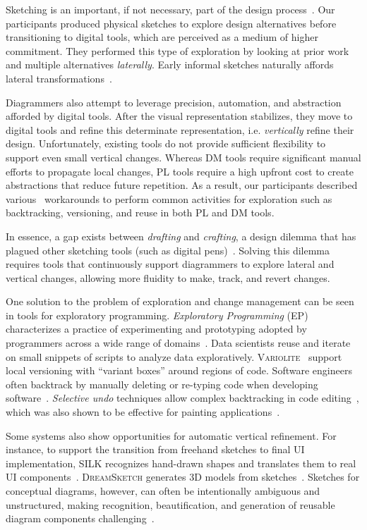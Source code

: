 Sketching is an important, if not necessary, part of the design process~\cite{BuxtonBook}. Our participants produced physical sketches to explore design alternatives before transitioning to digital tools, which are perceived as a medium of higher commitment. They performed this type of exploration by looking at prior work and multiple alternatives \emph{laterally}. Early informal sketches naturally affords lateral transformations~\cite{sketchesOfThought}. 

Diagrammers also attempt to leverage precision, automation, and abstraction afforded by digital tools. After the visual representation stabilizes, they move to digital tools and refine this determinate representation, i.e. \emph{vertically} refine their design. Unfortunately, existing tools do not provide sufficient flexibility to support even small vertical changes. Whereas DM tools require significant manual efforts to propagate local changes, PL tools require a high upfront cost to create abstractions that reduce future repetition. As a result, our participants described various ~workarounds to perform common activities for exploration such as backtracking, versioning, and reuse in both PL and DM tools. 

In essence, a gap exists between \emph{drafting} and \emph{crafting}, a design dilemma that has plagued other sketching tools (such as digital pens)~\cite{AsWeMayInk}. Solving this dilemma requires tools that continuously support diagrammers to explore lateral and vertical changes, allowing more fluidity to make, track, and revert changes.


One solution to the problem of exploration and change management can be seen in tools for exploratory programming. \emph{Exploratory Programming} (EP) characterizes a practice of experimenting and prototyping adopted by programmers across a wide range of domains~\cite{EP-Original,exploringEP}. Data scientists reuse and iterate on small snippets of scripts to analyze data exploratively. \textsc{Variolite}~\cite{Variolite} support local versioning with ``variant boxes'' around regions of code. Software engineers often backtrack by manually deleting or re-typing code when developing software~\cite{backtrackingLongitudinal}. \textit{Selective undo} techniques allow complex backtracking in code editing~\cite{SelectiveUndoSupport}, which was also shown to be effective for painting applications~\cite{selectiveUndoPainting}. 

Some systems also show opportunities for automatic vertical refinement. For instance, to support the transition from freehand sketches to final UI implementation, \textsc{SILK} recognizes hand-drawn shapes and translates them to real UI components~\cite{SILK}. \textsc{DreamSketch} generates 3D models from sketches~\cite{DreamSketch}. Sketches for conceptual diagrams, however, can often be intentionally ambiguous and unstructured, making recognition, beautification, and generation of reusable diagram components challenging~\cite{designSketches}.

